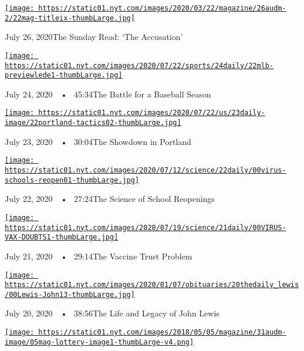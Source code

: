 \href{https://www.nytimes.com/2020/07/26/podcasts/the-daily/the-accusation-the-sunday-read.html?action=click\&module=audio-series-bar\&region=header\&pgtype=Article}{\texttt{[image: https://static01.nyt.com/images/2020/03/22/magazine/26audm-2/22mag-titleix-thumbLarge.jpg]}}

July 26, 2020The Sunday Read: `The Accusation'

\href{https://www.nytimes.com/2020/07/24/podcasts/the-daily/mlb-baseball-season-coronavirus.html?action=click\&module=audio-series-bar\&region=header\&pgtype=Article}{\texttt{[image: https://static01.nyt.com/images/2020/07/22/sports/24daily/22mlb-previewlede1-thumbLarge.jpg]}}

July 24, 2020~~•~ 45:34The Battle for a Baseball Season

\href{https://www.nytimes.com/2020/07/23/podcasts/the-daily/portland-protests.html?action=click\&module=audio-series-bar\&region=header\&pgtype=Article}{\texttt{[image: https://static01.nyt.com/images/2020/07/22/us/23daily-image/22portland-tactics02-thumbLarge.jpg]}}

July 23, 2020~~•~ 30:04The Showdown in Portland

\href{https://www.nytimes.com/2020/07/22/podcasts/the-daily/school-reopenings-coronavirus.html?action=click\&module=audio-series-bar\&region=header\&pgtype=Article}{\texttt{[image: https://static01.nyt.com/images/2020/07/12/science/22daily/00virus-schools-reopen01-thumbLarge.jpg]}}

July 22, 2020~~•~ 27:24The Science of School Reopenings

\href{https://www.nytimes.com/2020/07/21/podcasts/the-daily/coronavirus-vaccine.html?action=click\&module=audio-series-bar\&region=header\&pgtype=Article}{\texttt{[image: https://static01.nyt.com/images/2020/07/19/science/21daily/00VIRUS-VAX-DOUBTS1-thumbLarge.jpg]}}

July 21, 2020~~•~ 29:14The Vaccine Trust Problem

\href{https://www.nytimes.com/2020/07/20/podcasts/the-daily/john-lewis.html?action=click\&module=audio-series-bar\&region=header\&pgtype=Article}{\texttt{[image: https://static01.nyt.com/images/2020/01/07/obituaries/20thedaily\_lewis/00Lewis-John13-thumbLarge.jpg]}}

July 20, 2020~~•~ 38:56The Life and Legacy of John Lewis

\href{https://www.nytimes.com/2020/07/19/podcasts/the-daily/lottery-winner-scam.html?action=click\&module=audio-series-bar\&region=header\&pgtype=Article}{\texttt{[image: https://static01.nyt.com/images/2018/05/05/magazine/31audm-image/05mag-lottery-image1-thumbLarge-v4.png]}}

